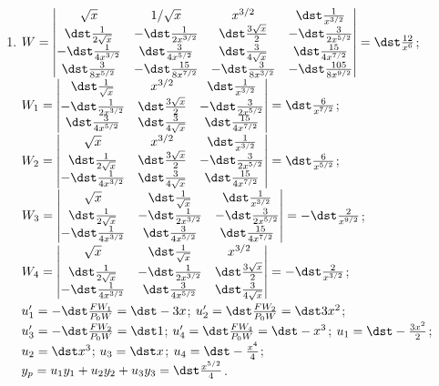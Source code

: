 \documentclass[openany]{book}
\newenvironment{sectionSolutions}{
 \begin{enumerate}[item-label={\thesection.\arabic{enumi}.}]
}{
 \end{enumerate}
}
\begin{document}
\begin{sectionSolutions}
\item
$W=\begin{vmatrix}
\sqrt{x}&1/\sqrt{x}&x^{3/2}&\dst\frac{1}{ x^{3/2}}
\\\dst\frac{1}{
2\sqrt{x}}&-\dst\frac{1}{ 2x^{3/2}}&\dst\frac{3\sqrt{x}}{
2}&-\dst\frac{3}{ 2x^{5/2}}\\
-\dst\frac{1}{
4x^{3/2}}&\dst\frac{3}{ 4x^{5/2}}&\dst\frac{3}{
4\sqrt{x}}&\dst\frac{15}{ 4x^{7/2}}\\
\dst\frac{3}{
8x^{5/2}}&-\dst\frac{15}{
8x^{7/2}}&-\dst\frac{3}{ 8x^{3/2}}&-\dst\frac{105}{ 8x^{9/2}}
\end{vmatrix}=\dst\frac{12}{ x^6}$;
$W_1=
\begin{vmatrix}
\dst\frac{1}{ \sqrt{x}}&x^{3/2}&\dst\frac{1}{ x^{3/2}}\\
-\dst\frac{1}{ 2x^{3/2}}&\dst\frac{3\sqrt{x}}{ 2}&-\dst\frac{3}{
2x^{5/2}}\\
\dst\frac{3}{ 4x^{5/2}}&\dst\frac{3}{ 4\sqrt{x}}&\dst\frac{15}{ 4x^{7/2}}
\end{vmatrix}=\dst\frac{6}{ x^{7/2}}$;
$W_2=\begin{vmatrix}
\sqrt{x}&x^{3/2}&\dst\frac{1}{ x^{3/2}}\\
\dst\frac{1}{ 2\sqrt{x}}&\dst\frac{3\sqrt{x}}{ 2}&-\dst\frac{3}{
2x^{5/2}}\\
-\dst\frac{1}{ 4x^{3/2}}&\dst\frac{3}{ 4\sqrt{x}}&\dst\frac{15}{ 4x^{7/2}}
\end{vmatrix}=\dst\frac{6}{ x^{5/2}}$;
$W_3=\begin{vmatrix}
\sqrt{x}&\dst\frac{1}{ \sqrt{x}}&\dst\frac{1}{ x^{3/2}}\\
\dst\frac{1}{ 2\sqrt{x}}&-\dst\frac{1}{ 2x^{3/2}}&-\dst\frac{3}{
2x^{5/2}}\\
-\dst\frac{1}{ 4x^{3/2}}&\dst\frac{3}{ 4x^{5/2}}&\dst\frac{15}{ 4x^{7/2}}
\end{vmatrix}=-\dst\frac{2}{ x^{9/2}}$;
$W_4=\begin{vmatrix}
\sqrt{x}&\dst\frac{1}{ \sqrt{x}}&x^{3/2}\\
\dst\frac{1}{ 2\sqrt{x}}&-\dst\frac{1}{ 2x^{3/2}}&\dst\frac{3\sqrt{x}}{ 2}\\
-\dst\frac{1}{ 4x^{3/2}}&\dst\frac{3}{ 4x^{5/2}}&\dst\frac{3}{ 4\sqrt{x}}
\end{vmatrix}=-\dst\frac{2}{ x^{3/2}}$;
$u_1'=-\dst\frac{FW_1}{ P_0W}=\dst-3x$;
$u_2'=\dst\frac{FW_2}{ P_0W}=\dst3x^2$;
$u_3'=-\dst\frac{FW_2}{ P_0W}=\dst1$;
$u_4'=\dst\frac{FW_4}{ P_0W}=\dst-x^3$;
$u_1=\dst-\frac{3x^2}{ 2}$;
$u_2=\dst x^3$;
$u_3=\dst x$;
$u_4=\dst-\frac{x^4}{ 4}$;
$y_p=u_1y_1+u_2y_2+u_3y_3=\dst \frac{x^{5/2}}{ 4}$.



\end{sectionSolutions}
\end{document}
